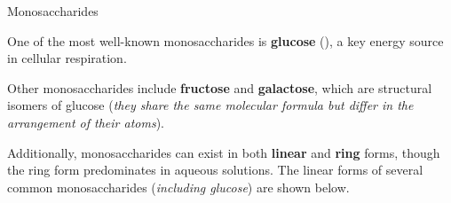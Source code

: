 \documentclass[10pt]{article}
\begin{document}
    \begin{core}{Monosaccharides}
  
      One of the most well-known monosaccharides is \textbf{glucose} (), a key energy source in cellular respiration.


      Other monosaccharides include \textbf{fructose} and \textbf{galactose}, which are structural isomers of glucose (\textit{they share the same molecular formula but differ in the arrangement of their atoms}).


      Additionally, monosaccharides can exist in both \textbf{linear} and \textbf{ring} forms, though the ring form predominates in aqueous solutions. The linear forms of several common monosaccharides (\textit{including glucose}) are shown below.


\end{core}
\end{document}
